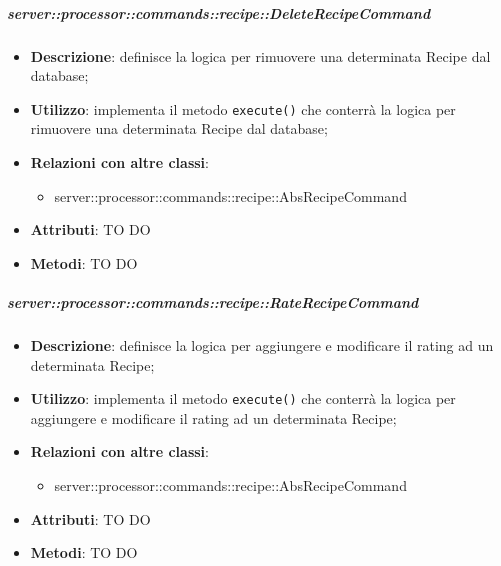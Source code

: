         \subparagraph{server::processor::commands::recipe::DeleteRecipeCommand} %
        \label{subp:bdsm_app_server_processor_commands_recipe_deleterecipecommand}
        \begin{itemize}
          \item \textbf{Descrizione}: definisce la logica per rimuovere una determinata Recipe dal database;
          \item \textbf{Utilizzo}: implementa il metodo \texttt{execute()} che conterrà la logica per rimuovere una determinata Recipe dal database;
          \item \textbf{Relazioni con altre classi}:
            \begin{itemize}
              \item server::processor::commands::recipe::AbsRecipeCommand
            \end{itemize}
			\item \textbf{Attributi}: TO DO
			\item \textbf{Metodi}: TO DO
        \end{itemize}

        \subparagraph{server::processor::commands::recipe::RateRecipeCommand} %
        \label{subp:bdsm_app_server_processor_commands_recipe_raterecipecommand}
        \begin{itemize}
          \item \textbf{Descrizione}: definisce la logica per aggiungere e modificare il rating ad un determinata Recipe;
          \item \textbf{Utilizzo}: implementa il metodo \texttt{execute()} che conterrà la logica per aggiungere e modificare il rating ad un determinata Recipe;
          \item \textbf{Relazioni con altre classi}:
            \begin{itemize}
              \item server::processor::commands::recipe::AbsRecipeCommand
            \end{itemize}
			\item \textbf{Attributi}: TO DO
			\item \textbf{Metodi}: TO DO
        \end{itemize}


